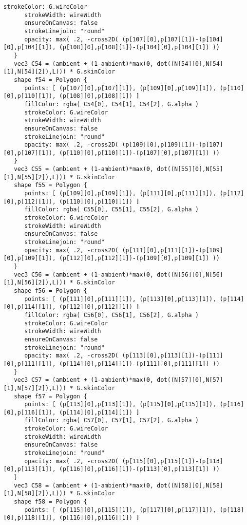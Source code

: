 \begin{lstlisting}[language=Sty-RT,escapechar=@]
      strokeColor: G.wireColor
      strokeWidth: wireWidth
      ensureOnCanvas: false
      strokeLinejoin: "round"
      opacity: max( .2, -cross2D( (p[107][0],p[107][1])-(p[104][0],p[104][1]), (p[108][0],p[108][1])-(p[104][0],p[104][1]) ))
   }
   vec3 C54 = (ambient + (1-ambient)*max(0, dot((N[54][0],N[54][1],N[54][2]),L))) * G.skinColor
   shape f54 = Polygon {
      points: [ (p[107][0],p[107][1]), (p[109][0],p[109][1]), (p[110][0],p[110][1]), (p[108][0],p[108][1]) ]
      fillColor: rgba( C54[0], C54[1], C54[2], G.alpha )
      strokeColor: G.wireColor
      strokeWidth: wireWidth
      ensureOnCanvas: false
      strokeLinejoin: "round"
      opacity: max( .2, -cross2D( (p[109][0],p[109][1])-(p[107][0],p[107][1]), (p[110][0],p[110][1])-(p[107][0],p[107][1]) ))
   }
   vec3 C55 = (ambient + (1-ambient)*max(0, dot((N[55][0],N[55][1],N[55][2]),L))) * G.skinColor
   shape f55 = Polygon {
      points: [ (p[109][0],p[109][1]), (p[111][0],p[111][1]), (p[112][0],p[112][1]), (p[110][0],p[110][1]) ]
      fillColor: rgba( C55[0], C55[1], C55[2], G.alpha )
      strokeColor: G.wireColor
      strokeWidth: wireWidth
      ensureOnCanvas: false
      strokeLinejoin: "round"
      opacity: max( .2, -cross2D( (p[111][0],p[111][1])-(p[109][0],p[109][1]), (p[112][0],p[112][1])-(p[109][0],p[109][1]) ))
   }
   vec3 C56 = (ambient + (1-ambient)*max(0, dot((N[56][0],N[56][1],N[56][2]),L))) * G.skinColor
   shape f56 = Polygon {
      points: [ (p[111][0],p[111][1]), (p[113][0],p[113][1]), (p[114][0],p[114][1]), (p[112][0],p[112][1]) ]
      fillColor: rgba( C56[0], C56[1], C56[2], G.alpha )
      strokeColor: G.wireColor
      strokeWidth: wireWidth
      ensureOnCanvas: false
      strokeLinejoin: "round"
      opacity: max( .2, -cross2D( (p[113][0],p[113][1])-(p[111][0],p[111][1]), (p[114][0],p[114][1])-(p[111][0],p[111][1]) ))
   }
   vec3 C57 = (ambient + (1-ambient)*max(0, dot((N[57][0],N[57][1],N[57][2]),L))) * G.skinColor
   shape f57 = Polygon {
      points: [ (p[113][0],p[113][1]), (p[115][0],p[115][1]), (p[116][0],p[116][1]), (p[114][0],p[114][1]) ]
      fillColor: rgba( C57[0], C57[1], C57[2], G.alpha )
      strokeColor: G.wireColor
      strokeWidth: wireWidth
      ensureOnCanvas: false
      strokeLinejoin: "round"
      opacity: max( .2, -cross2D( (p[115][0],p[115][1])-(p[113][0],p[113][1]), (p[116][0],p[116][1])-(p[113][0],p[113][1]) ))
   }
   vec3 C58 = (ambient + (1-ambient)*max(0, dot((N[58][0],N[58][1],N[58][2]),L))) * G.skinColor
   shape f58 = Polygon {
      points: [ (p[115][0],p[115][1]), (p[117][0],p[117][1]), (p[118][0],p[118][1]), (p[116][0],p[116][1]) ]

\end{lstlisting}
